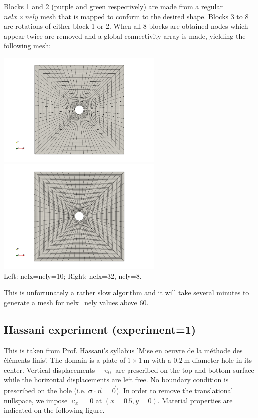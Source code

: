 Blocks 1 and 2 (purple and green respectively) are made from a regular $nelx\times nely$ mesh that is 
mapped to conform to the desired shape. Blocks 3 to 8 are rotations 
of either block 1 or 2.  
When all 8 blocks are obtained nodes which appear twice are removed
and a global connectivity array is made, yielding the following mesh: 

\begin{center}
\includegraphics[width=8cm]{python_codes/fieldstone_124/results/mesh2}
\includegraphics[width=8cm]{python_codes/fieldstone_124/results/mesh4}\\
{\captionfont Left: nelx=nely=10; Right: nelx=32, nely=8.}
\end{center}

This is unfortunately a rather slow algorithm and it will take 
several minutes to generate a mesh for {\python nelx}={\python nely} values above 60.

\newpage
\subsection*{Hassani experiment (experiment=1)}

This is taken from Prof. Hassani's syllabus 'Mise en oeuvre de la m\'ethode des \'el\'ements finis'.
The domain is a plate of $1\times 1~\si{\meter}$ with a $0.2~\si{\meter}$ diameter hole in its center.
Vertical displacements $\pm \upupsilon_0$ are prescribed on the top and bottom surface while 
the horizontal displacements are left free. No boundary condition is prescribed on the hole (i.e.
${\bm \sigma}\cdot \vec{n}=\vec{0}$).
In order to remove the translational nullspace, we impose $\upupsilon_x=0$
at $(x=0.5,y=0)$. Material properties are indicated on the following figure.

